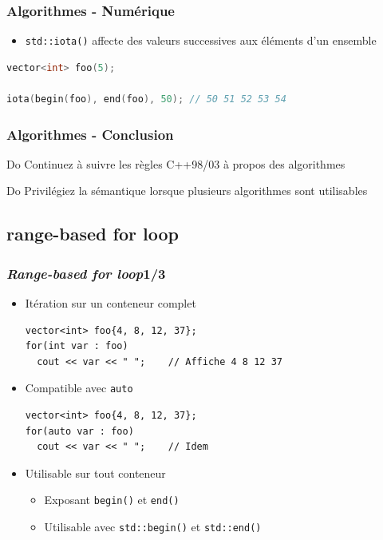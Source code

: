 \documentclass[C++.tex]{subfiles}
\begin{document}
\begin{frame}[fragile]
	\frametitle{Algorithmes - Numérique}
	\begin{itemize}
		\item \lstinline|std::iota()| affecte des valeurs successives aux éléments d'un ensemble
	\end{itemize}

	\begin{lstlisting}[language=C++]
vector<int> foo(5);

iota(begin(foo), end(foo), 50); // 50 51 52 53 54\end{lstlisting}
\end{frame}

\begin{frame}[fragile]
	\frametitle{Algorithmes - Conclusion}
	\begin{exampleblock}{Do}
		Continuez à suivre les règles C++98/03 à propos des algorithmes
	\end{exampleblock}

	\begin{exampleblock}{Do}
		Privilégiez la sémantique lorsque plusieurs algorithmes sont utilisables
	\end{exampleblock}
\end{frame}

\subsection*{range-based for loop}
\begin{frame}[fragile]
	\frametitle{\textit{Range-based for loop}\titlehfill{}1/3}
	\begin{itemize}
		\item Itération sur un \og conteneur\fg{} complet

	\begin{lstlisting}
vector<int> foo{4, 8, 12, 37};
for(int var : foo)
  cout << var << " ";    // Affiche 4 8 12 37\end{lstlisting}

		\item Compatible avec \lstinline|auto|

	\begin{lstlisting}
vector<int> foo{4, 8, 12, 37};
for(auto var : foo)
  cout << var << " ";    // Idem\end{lstlisting}

		\item Utilisable sur tout conteneur
		\begin{itemize}
			\item Exposant \lstinline|begin()| et \lstinline|end()|
			\item Utilisable avec \lstinline|std::begin()| et \lstinline|std::end()|
		\end{itemize}
	\end{itemize}
\end{frame}
\end{document}
